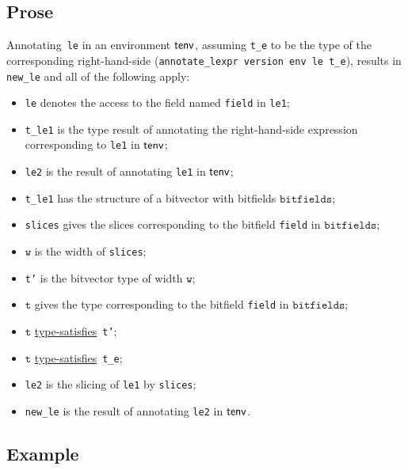 \documentclass{book}
\newcommand\typesatisfies[0]{\hyperlink{def-typesatisfies}{type-satisfies}}
\newcommand\vt[0]{\texttt{t}}
\newcommand\vw[0]{\texttt{w}}
\newcommand\bitfields[0]{\texttt{bitfields}}
\begin{document}
    \subsection{Prose}
   Annotating~\texttt{le} in an environment $\textsf{tenv}$, assuming
\texttt{t\_e} to be the type of the corresponding right-hand-side
(\texttt{annotate\_lexpr version env le t\_e}), results in \texttt{new\_le} and
all of the following apply:
   \begin{itemize}
   \item \texttt{le} denotes the access to the field named \texttt{field} in \texttt{le1};
   \item \texttt{t\_le1} is the type result of annotating the right-hand-side expression corresponding to \texttt{le1} in $\textsf{tenv}$;
   \item \texttt{le2} is the result of annotating \texttt{le1} in $\textsf{tenv}$;
   \item \texttt{t\_le1} has the structure of a bitvector with bitfields $\bitfields$;
   \item \texttt{slices} gives the slices corresponding to the bitfield \texttt{field} in
      $\bitfields$;
   \item $\vw$ is the width of \texttt{slices};
   \item \texttt{t'} is the bitvector type of width $\vw$;
   \item $\vt$ gives the type corresponding to the bitfield \texttt{field} in
      $\bitfields$;
   \item $\vt$ \typesatisfies\  \texttt{t'};
   \item $\vt$ \typesatisfies\  \texttt{t\_e};
   \item \texttt{le2} is the slicing of \texttt{le1} by \texttt{slices};
   \item \texttt{new\_le} is the result of annotating \texttt{le2} in $\textsf{tenv}$.
   \end{itemize}

  \subsection{Example}


\end{document}
